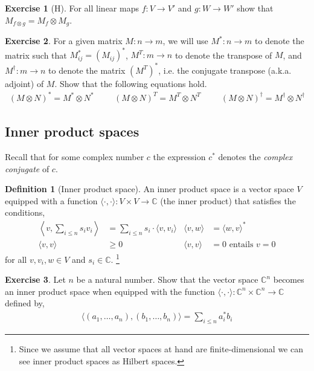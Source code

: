 \documentclass[a4paper, 11pt]{article}
\newcommand{\complex}{\mathbb{C}}
\theoremstyle{definition}
\newtheorem{definition}{Definition}
\newtheorem{exercise}{Exercise}
\begin{document}
\begin{exercise}[H]
  For all linear maps $f : V \to V'$ and $g : W \to W'$ show that
  $M_{f \otimes g} = M_f \otimes M_g$.
\end{exercise}


\begin{exercise}
  For a given matrix $M : n \to m$, we will use $M^\ast : n \to m$ to
  denote the matrix such that $M_{ij}^\ast = (M_{ij})^\ast$,
  $M^T : m \to n$ to denote the transpose of $M$, and
  $M^\dagger : m \to n$ to denote the matrix $(M^T)^\ast$, i.e. the
  conjugate transpose (a.k.a. adjoint) of $M$. Show that the following
  equations hold.
  \begin{align*}
    (M \otimes N)^\ast = M^\ast \otimes N^\ast \hspace{1cm}
    (M \otimes N)^T = M^T \otimes N^T \hspace{1cm}
    (M \otimes N)^\dagger = M^\dagger \otimes N^\dagger
  \end{align*}
\end{exercise}


\subsection{Inner product spaces}

Recall that for some complex number $c$ the expression $c^\ast$
denotes the \emph{complex conjugate} of $c$.

\begin{definition}[Inner product space] An inner product space is a
  vector space $V$ equipped with a function
  $\langle \cdot,\cdot \rangle : V \times V \to \complex$ (the inner
  product) that satisfies the conditions,
  \begin{align*}
    \left \langle v, \sum_{i \leq n} s_i v_i \right \rangle
    & = \sum_{i \leq n} s_i \cdot \langle v,v_i \rangle
    & \langle v,w \rangle  & = \langle w,v \rangle^\ast \\
    \langle v,v \rangle & \geq 0 & 
    \langle v,v \rangle & = 0 \text{ entails } v = 0
  \end{align*}
  for all $v, v_i, w \in V$ and $s_i \in \complex$.  \footnote{Since
    we assume that all vector spaces at hand are finite-dimensional we
    can see inner product spaces as Hilbert spaces.}
\end{definition}

\begin{exercise}
  Let $n$ be a natural number.  Show that the vector space
  $\complex^n$ becomes an inner product space when equipped with the
  function $\langle \cdot, \cdot \rangle
  : \complex^n \times \complex^n \to \complex$
  defined by,
  \begin{align*}
   \langle (a_1,\dots,a_n),(b_1,\dots,b_n) \rangle = \sum_{i \leq n} a_i^\ast b_i 
  \end{align*}
\end{exercise}
\end{document}

